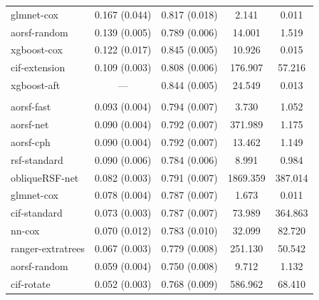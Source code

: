 \documentclass{article}\usepackage[]{graphicx}\usepackage[]{xcolor}
\newenvironment{knitrout}{}{} %
\begin{document}
\begin{knitrout}
\begin{longtable}[t]{lcccc}
\hspace{1em}glmnet-cox & 0.167 (0.044) & 0.817 (0.018) & 2.141 & 0.011\\
\hspace{1em}aorsf-random & 0.139 (0.005) & 0.789 (0.006) & 14.001 & 1.519\\
\hspace{1em}xgboost-cox & 0.122 (0.017) & 0.845 (0.005) & 10.926 & 0.015\\
\hspace{1em}cif-extension & 0.109 (0.003) & 0.808 (0.006) & 176.907 & 57.216\\
\hspace{1em}xgboost-aft & --- & 0.844 (0.005) & 24.549 & 0.013\\
\addlinespace[0.3em]
\multicolumn{5}{l}{\textit{\textbf{ARIC; stroke, n = 13623, p = 41}}}\\
\hline
\hspace{1em}aorsf-fast & 0.093 (0.004) & 0.794 (0.007) & 3.730 & 1.052\\
\hspace{1em}aorsf-net & 0.090 (0.004) & 0.792 (0.007) & 371.989 & 1.175\\
\hspace{1em}aorsf-cph & 0.090 (0.004) & 0.792 (0.007) & 13.462 & 1.149\\
\hspace{1em}rsf-standard & 0.090 (0.006) & 0.784 (0.006) & 8.991 & 0.984\\
\hspace{1em}obliqueRSF-net & 0.082 (0.003) & 0.791 (0.007) & 1869.359 & 387.014\\
\hspace{1em}glmnet-cox & 0.078 (0.004) & 0.787 (0.007) & 1.673 & 0.011\\
\hspace{1em}cif-standard & 0.073 (0.003) & 0.787 (0.007) & 73.989 & 364.863\\
\hspace{1em}nn-cox & 0.070 (0.012) & 0.783 (0.010) & 32.099 & 82.720\\
\hspace{1em}ranger-extratrees & 0.067 (0.003) & 0.779 (0.008) & 251.130 & 50.542\\
\hspace{1em}aorsf-random & 0.059 (0.004) & 0.750 (0.008) & 9.712 & 1.132\\
\hspace{1em}cif-rotate & 0.052 (0.003) & 0.768 (0.009) & 586.962 & 68.410\\

\end{longtable}
\end{knitrout}
\end{document}
